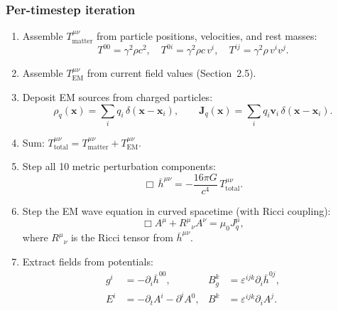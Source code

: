 \documentclass[11pt,a4paper]{article}
\newcommand{\vv}[1]{\mathbf{#1}}
\begin{document}
\subsubsection*{Per-timestep iteration}
\begin{enumerate}
  \item Assemble $T^{\mu\nu}_{\mathrm{matter}}$ from particle positions, velocities, and rest masses:
  \begin{equation}
    T^{00} = \gamma^2\rho c^2,\quad T^{0i} = \gamma^2\rho c\,v^i,\quad T^{ij} = \gamma^2\rho\,v^i v^j.
  \end{equation}

  \item Assemble $T^{\mu\nu}_{\mathrm{EM}}$ from current field values (Section~2.5).

  \item Deposit EM sources from charged particles:
  \begin{equation}
    \rho_q(\vv{x}) = \sum_i q_i\,\delta(\vv{x}-\vv{x}_i), \qquad
    \vv{J}_q(\vv{x}) = \sum_i q_i\vv{v}_i\,\delta(\vv{x}-\vv{x}_i).
  \end{equation}

  \item Sum: $T^{\mu\nu}_{\mathrm{total}} = T^{\mu\nu}_{\mathrm{matter}} + T^{\mu\nu}_{\mathrm{EM}}$.

  \item Step all 10 metric perturbation components:
  \begin{equation}
    \Box\,\bar{h}^{\mu\nu} = -\frac{16\pi G}{c^4}\,T^{\mu\nu}_{\mathrm{total}}.
  \end{equation}

  \item Step the EM wave equation in curved spacetime (with Ricci coupling):
  \begin{equation}
    \Box A^\mu + R^\mu{}_\nu A^\nu = \mu_0 J^\mu_q,
  \end{equation}
  where $R^\mu{}_\nu$ is the Ricci tensor from $\bar{h}^{\mu\nu}$.

  \item Extract fields from potentials:
  \begin{align}
    g^i  &= -\partial_i\bar{h}^{00}, &
    B_g^k &= \varepsilon^{ijk}\partial_i\bar{h}^{0j}, \\
    E^i  &= -\partial_t A^i - \partial^i A^0, &
    B^k  &= \varepsilon^{ijk}\partial_i A^j.
  \end{align}


\end{enumerate}
\end{document}
